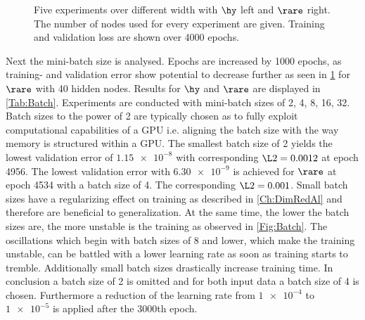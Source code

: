 \begin{center}
	\begin{figure}[htbp!]
		
		
		\caption{Five experiments over different width with $\hy$ left and $\rare$ right. The number of nodes used for every experiment are given. Training and validation loss are shown over 4000 epochs.}
		\label{Fig:Width}
	\end{figure}
\end{center}
Next the mini-batch size is analysed. Epochs are increased by 1000 epochs, as training- and validation error show potential to decrease further as seen in \cref{Fig:Width} for \(\rare\) with 40 hidden nodes. Results for $\hy$  and  $\rare$ are displayed in \cref{Tab:Batch}. Experiments are conducted with mini-batch sizes of 2, 4, 8, 16, 32. Batch sizes to the power of 2 are typically chosen as to fully exploit computational capabilities of a GPU i.e. aligning the batch size with the way memory is structured within a GPU. The smallest batch size of 2 yields the lowest validation error of \(\num{1.15e-8}\) with corresponding \(\L2 = 0.0012\) at epoch 4956. The lowest validation error with \(\num{6.30e-9}\) is achieved for \(\rare\) at epoch 4534 with a batch size of 4. The corresponding \(\L2 = 0.001\). Small batch sizes have a regularizing effect on training as described in \cref{Ch:DimRedAl} and therefore are beneficial to generalization. At the same time, the lower the batch sizes are, the more unstable is the training as observed in \cref{Fig:Batch}. The oscillations which begin with batch sizes of 8 and lower, which make the training unstable, can be battled with a lower learning rate as soon as training starts to tremble. Additionally small batch sizes drastically increase training time. In conclusion a batch size of 2 is omitted and for both input data a batch size of 4 is chosen. Furthermore a reduction of the learning rate from \(\num{1e-4}\) to \(\num{1e-5}\) is applied after the 3000th epoch.\\

